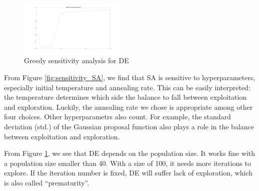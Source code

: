\documentclass{IEEEtran}
\begin{document}
{{        \begin{figure}[!htbp]
            \centering
            \includegraphics[width=0.45\textwidth]{Q1/figures/eggholder_DE_metasearch_population_size.png}
            \caption{Greedy sensitivity analysis for DE}
            \label{fig:sensitivity_DE}
        \end{figure}

        From Figure \ref{fig:sensitivity_SA}, we find that SA is sensitive to hyperparameters, especially initial temperature and annealing rate.
        This can be easily interpreted: the temperature determines which side the balance to fall between exploitation and exploration. 
        Luckily, the annealing rate we chose is appropriate among other four choices.
        Other hyperparametrs also count. 
        For example, the standard deviation (std.) of the Gaussian proposal function also plays a role in the balance between exploitation and exploration.

        From Figure \ref{fig:sensitivity_DE}, we see that DE depends on the population size. 
        It works fine with a population size smaller than 40. 
        With a size of 100, it needs more iterations to explore.
        If the iteration number is fixed, DE will suffer lack of exploration, which is also called ``prematurity''.
        
    }
}
\end{document}
